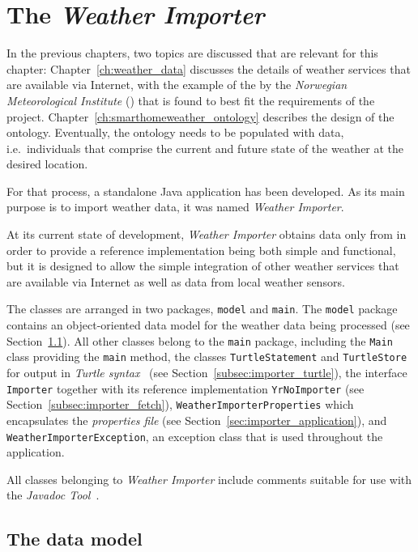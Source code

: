 \chapter{The \emph{Weather Importer}}
\label{ch:weather_importer}

In the previous chapters, two topics are discussed that are relevant for this chapter: Chapter~\ref{ch:weather_data} discusses the details of weather services that are available via Internet, with the example of the  by the \emph{Norwegian Meteorological Institute} (\yrno) that is found to best fit the requirements of the \smarthomeweather project. Chapter~\ref{ch:smarthomeweather_ontology} describes the design of the \smarthomeweather ontology. Eventually, the ontology needs to be populated with data, i.e.\ individuals that comprise the current and future state of the weather at the desired location.

For that process, a standalone Java application has been developed. As its main purpose is to import weather data, it was named \emph{Weather Importer}.

At its current state of development, \emph{Weather Importer} obtains data only from \yrno in order to provide a reference implementation being both simple and functional, but it is designed to allow the simple integration of other weather services that are available via Internet as well as data from local weather sensors.

The classes are arranged in two packages, \texttt{model} and \texttt{main}. The \texttt{model} package contains an object-oriented data model for the weather data being processed (see Section~\ref{sec:importer_model}). All other classes belong to the \texttt{main} package, including the \texttt{Main} class providing the \texttt{main} method, the classes \texttt{TurtleStatement} and \texttt{TurtleStore} for output in \emph{\acs{Turtle} syntax}~\cite{Turtle} (see Section~\ref{subsec:importer_turtle}), the interface \texttt{Importer} together with its reference implementation \texttt{YrNoImporter} (see Section~\ref{subsec:importer_fetch}), \texttt{WeatherImporterProperties} which encapsulates the \emph{properties file} (see Section~\ref{sec:importer_application}), and \texttt{WeatherImporterException}, an exception class that is used throughout the application.

All classes belonging to \emph{Weather Importer} include comments suitable for use with the \emph{Javadoc Tool}~\cite{javadoc}.

\section{The data model}
\label{sec:importer_model}


